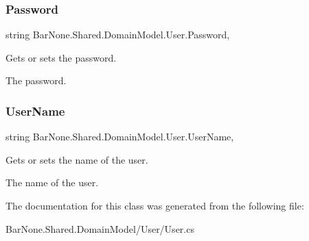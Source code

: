 \subsubsection{\texorpdfstring{Password}{Password}}
{\footnotesize\ttfamily string Bar\+None.\+Shared.\+Domain\+Model.\+User.\+Password\hspace{0.3cm}{\ttfamily [get]}, {\ttfamily [set]}}



Gets or sets the password. 

The password. \mbox{\label{class_bar_none_1_1_shared_1_1_domain_model_1_1_user_a664cea63b485b0597fe6a71394e8c600}} 
\subsubsection{\texorpdfstring{User\+Name}{UserName}}
{\footnotesize\ttfamily string Bar\+None.\+Shared.\+Domain\+Model.\+User.\+User\+Name\hspace{0.3cm}{\ttfamily [get]}, {\ttfamily [set]}}



Gets or sets the name of the user. 

The name of the user. 

The documentation for this class was generated from the following file\+:\begin{DoxyCompactItemize}
\item 
Bar\+None.\+Shared.\+Domain\+Model/\+User/User.\+cs\end{DoxyCompactItemize}
